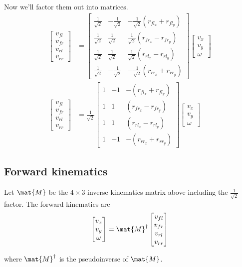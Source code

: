 Now we'll factor them out into matrices.
\begin{align}
  \begin{bmatrix}
    v_{fl} \\
    v_{fr} \\
    v_{rl} \\
    v_{rr}
  \end{bmatrix} &=
  \begin{bmatrix}
    \frac{1}{\sqrt{2}} & -\frac{1}{\sqrt{2}} &
      -\frac{1}{\sqrt{2}}(r_{fl_x} + r_{fl_y}) \\
    \frac{1}{\sqrt{2}} &  \frac{1}{\sqrt{2}} &
      \frac{1}{\sqrt{2}}(r_{fr_x} - r_{fr_y}) \\
    \frac{1}{\sqrt{2}} &  \frac{1}{\sqrt{2}} &
      \frac{1}{\sqrt{2}}(r_{rl_x} - r_{rl_y}) \\
    \frac{1}{\sqrt{2}} & -\frac{1}{\sqrt{2}} &
      -\frac{1}{\sqrt{2}}(r_{rr_x} + r_{rr_y})
  \end{bmatrix}
  \begin{bmatrix}
    v_x \\
    v_y \\
    \omega
  \end{bmatrix} \nonumber \\
  \begin{bmatrix}
    v_{fl} \\
    v_{fr} \\
    v_{rl} \\
    v_{rr}
  \end{bmatrix} &= \frac{1}{\sqrt{2}}
  \begin{bmatrix}
    1 & -1  & -(r_{fl_x} + r_{fl_y}) \\
    1 &  1  &  (r_{fr_x} - r_{fr_y}) \\
    1 &  1  &  (r_{rl_x} - r_{rl_y}) \\
    1 & -1  & -(r_{rr_x} + r_{rr_y})
  \end{bmatrix}
  \begin{bmatrix}
    v_x \\
    v_y \\
    \omega
  \end{bmatrix}
\end{align}

\subsection{Forward kinematics}

Let $\mat{M}$ be the $4 \times 3$ inverse kinematics matrix above including the
$\frac{1}{\sqrt{2}}$ factor. The forward kinematics are
\begin{equation}
  \begin{bmatrix}
    v_x \\
    v_y \\
    \omega
  \end{bmatrix} =
  \mat{M}^\dagger
  \begin{bmatrix}
    v_{fl} \\
    v_{fr} \\
    v_{rl} \\
    v_{rr}
  \end{bmatrix}
\end{equation}

where $\mat{M}^\dagger$ is the pseudoinverse of $\mat{M}$.
